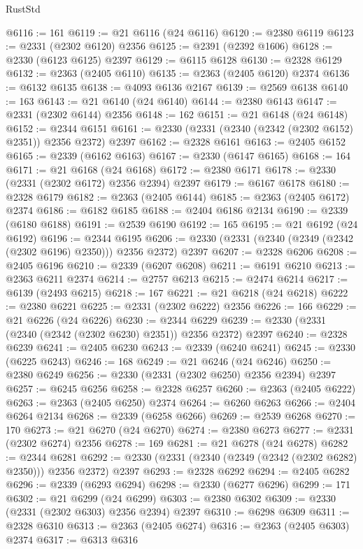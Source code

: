 \begin{lexlean}{RustStd}
\begin{coremodule}
@6116 := 161
@6119 := @21 @6116 (@24 @6116)
@6120 := @2380 @6119
@6123 := @2331 (@2302 @6120) @2356
@6125 := @2391 (@2392 @1606)
@6128 := @2330 (@6123 @6125) @2397
@6129 := @6115 @6128
@6130 := @2328 @6129
@6132 := @2363 (@2405 @6110)
@6135 := @2363 (@2405 @6120) @2374
@6136 := @6132 @6135
@6138 := @4093 @6136 @2167
@6139 := @2569 @6138
@6140 := 163
@6143 := @21 @6140 (@24 @6140)
@6144 := @2380 @6143
@6147 := @2331 (@2302 @6144) @2356
@6148 := 162
@6151 := @21 @6148 (@24 @6148)
@6152 := @2344 @6151
@6161 := @2330 (@2331 (@2340 (@2342 (@2302 @6152) @2351)) @2356 @2372) @2397
@6162 := @2328 @6161
@6163 := @2405 @6152
@6165 := @2339 (@6162 @6163)
@6167 := @2330 (@6147 @6165)
@6168 := 164
@6171 := @21 @6168 (@24 @6168)
@6172 := @2380 @6171
@6178 := @2330 (@2331 (@2302 @6172) @2356 @2394) @2397
@6179 := @6167 @6178
@6180 := @2328 @6179
@6182 := @2363 (@2405 @6144)
@6185 := @2363 (@2405 @6172) @2374
@6186 := @6182 @6185
@6188 := @2404 @6186 @2134
@6190 := @2339 (@6180 @6188)
@6191 := @2539 @6190
@6192 := 165
@6195 := @21 @6192 (@24 @6192)
@6196 := @2344 @6195
@6206 := @2330 (@2331 (@2340 (@2349 (@2342 (@2302 @6196) @2350))) @2356 @2372) @2397
@6207 := @2328 @6206
@6208 := @2405 @6196
@6210 := @2339 (@6207 @6208)
@6211 := @6191 @6210
@6213 := @2363 @6211 @2374
@6214 := @2757 @6213
@6215 := @2474 @6214
@6217 := @6139 (@2493 @6215)
@6218 := 167
@6221 := @21 @6218 (@24 @6218)
@6222 := @2380 @6221
@6225 := @2331 (@2302 @6222) @2356
@6226 := 166
@6229 := @21 @6226 (@24 @6226)
@6230 := @2344 @6229
@6239 := @2330 (@2331 (@2340 (@2342 (@2302 @6230) @2351)) @2356 @2372) @2397
@6240 := @2328 @6239
@6241 := @2405 @6230
@6243 := @2339 (@6240 @6241)
@6245 := @2330 (@6225 @6243)
@6246 := 168
@6249 := @21 @6246 (@24 @6246)
@6250 := @2380 @6249
@6256 := @2330 (@2331 (@2302 @6250) @2356 @2394) @2397
@6257 := @6245 @6256
@6258 := @2328 @6257
@6260 := @2363 (@2405 @6222)
@6263 := @2363 (@2405 @6250) @2374
@6264 := @6260 @6263
@6266 := @2404 @6264 @2134
@6268 := @2339 (@6258 @6266)
@6269 := @2539 @6268
@6270 := 170
@6273 := @21 @6270 (@24 @6270)
@6274 := @2380 @6273
@6277 := @2331 (@2302 @6274) @2356
@6278 := 169
@6281 := @21 @6278 (@24 @6278)
@6282 := @2344 @6281
@6292 := @2330 (@2331 (@2340 (@2349 (@2342 (@2302 @6282) @2350))) @2356 @2372) @2397
@6293 := @2328 @6292
@6294 := @2405 @6282
@6296 := @2339 (@6293 @6294)
@6298 := @2330 (@6277 @6296)
@6299 := 171
@6302 := @21 @6299 (@24 @6299)
@6303 := @2380 @6302
@6309 := @2330 (@2331 (@2302 @6303) @2356 @2394) @2397
@6310 := @6298 @6309
@6311 := @2328 @6310
@6313 := @2363 (@2405 @6274)
@6316 := @2363 (@2405 @6303) @2374
@6317 := @6313 @6316

\end{coremodule}
\end{lexlean}
